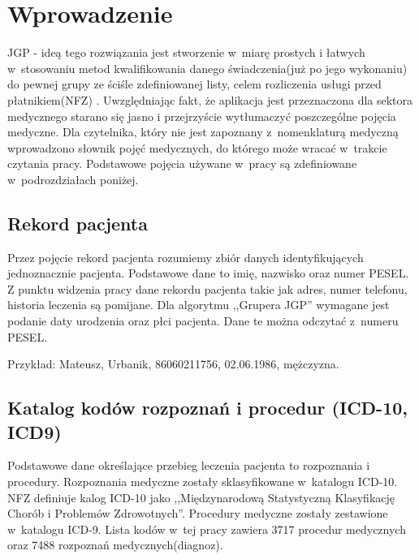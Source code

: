 \chapter{Wprowadzenie}
\label{cha:wprowadzenie}

JGP - ideą tego rozwiązania jest stworzenie w~miarę prostych i łatwych w~stosowaniu metod kwalifikowania danego świadczenia(już po jego wykonaniu) do pewnej grupy ze ściśle zdefiniowanej listy, celem rozliczenia usługi przed płatnikiem(NFZ) \cite{kozierkiewicz_jgp}.
Uwzględniając fakt, że aplikacja jest przeznaczona dla sektora medycznego starano się jasno i przejrzyście wytłumaczyć poszczególne pojęcia medyczne. Dla czytelnika, który nie jest zapoznany z~nomenklaturą medyczną wprowadzono słownik pojęć medycznych, do którego może wracać w~trakcie czytania pracy. Podstawowe pojęcia używane w~pracy są zdefiniowane w~podrozdziałach poniżej.  


\section{Rekord pacjenta}
\label{sec:rekordPacjenta}

Przez pojęcie rekord pacjenta rozumiemy zbiór danych identyfikujących jednoznacznie pacjenta. Podstawowe dane to imię, nazwisko oraz numer PESEL. Z punktu widzenia pracy dane rekordu pacjenta takie jak adres, numer telefonu, historia leczenia są pomijane. Dla algorytmu ,,Grupera JGP'' wymagane jest podanie daty urodzenia oraz płci pacjenta\cite{algorytm_grupera}. Dane te można odczytać z~numeru PESEL.

Przykład:
Mateusz, Urbanik, 86060211756, 02.06.1986, mężczyzna.


\section{Katalog kodów rozpoznań i procedur (ICD-10, ICD9)}
\label{sec:kodyICD}

Podstawowe dane określające przebieg leczenia pacjenta to rozpoznania i procedury. Rozpoznania medyczne zostały sklasyfikowane w~katalogu ICD-10. NFZ definiuje kalog ICD-10 jako ,,Międzynarodową Statystyczną Klasyfikację Chorób i Problemów Zdrowotnych''\cite{forumNFZ}.
Procedury medyczne zostały zestawione w~katalogu ICD-9. Lista kodów w~tej pracy zawiera 3717 procedur medycznych oraz 7488 rozpoznań medycznych(diagnoz)\cite{plik_parametryzujacy}.

